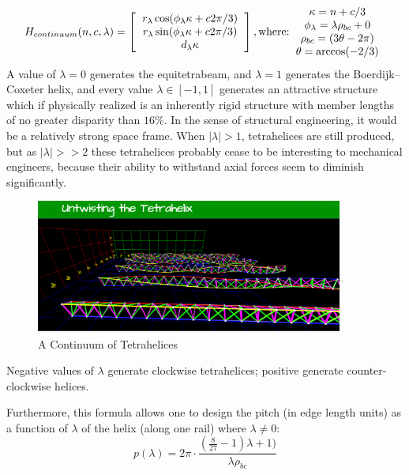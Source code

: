 \documentclass[11pt]{article}
\begin{document}
\[
H_{continuum}(n,c,\lambda) =
\left [
  \begin{tabular}{c}
   $ r_{\lambda} \cos(\phi_{\lambda} \kappa + c 2 \pi /3) $\\
   $ r_{\lambda}  \sin(\phi_{\lambda} \kappa + c 2 \pi /3) $\\
   $ d_{\lambda} \kappa $
  \end{tabular}
  \right ],
\text{where:}
  \begin{tabular}{c}
    $\kappa = n + c/3$ \\
    $ \phi_{\lambda} =  \lambda \rho_{bc}  + 0 $\\
    $\rho_{bc} = (3 \theta - 2 \pi)$ \\
   $ \theta = \arccos(-2/3) $
  \end{tabular}      
\]
A value of $\lambda = 0$ generates the equitetrabeam, and $\lambda = 1$ generates the Boerdijk--Coxeter helix, and every
value $\lambda \in [-1,1]$ generates an attractive structure which if physically realized is an inherently rigid structure
with member lengths of no greater disparity than $16\%$.
In the sense of structural engineering, it would be a relatively strong space frame. When $\lvert \lambda \rvert > 1$, tetrahelices
are still produced, but as $\lvert \lambda \rvert >> 2$ these tetrahelices probably cease to be interesting to mechanical engineers,
because their ability to withstand axial forces seem to diminish significantly.

 \begin{figure}[H]
     \centering
     \includegraphics[width=0.9\textwidth]{figures/Continuum.png}
     \caption{A Continuum of Tetrahelices}
 \end{figure}


Negative values of $\lambda$ generate clockwise tetrahelices; positive generate counter-clockwise helices.

Furthermore, this formula allows one to design the pitch (in edge length units) as a function of $\lambda$ of the helix (along one rail)
where $\lambda \neq 0$:
\[
p(\lambda) = 2 \pi  \cdot \frac{(\frac{8}{27} -1) \lambda +1)}{ \lambda  \rho_{bc} }
\]
\end{document}
